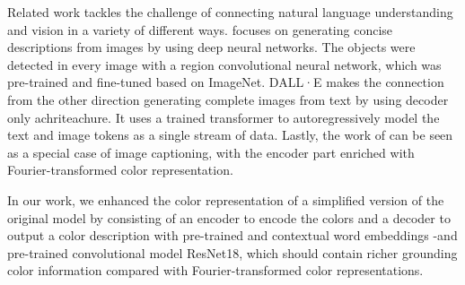 \par
Related work tackles the challenge of connecting natural language understanding and vision in a variety of different ways. \citep{karpathy-2014-image_descriptions} focuses on generating concise descriptions from images by using deep neural networks. The objects were detected in every image with a region convolutional neural network, which was  pre-trained and fine-tuned based on ImageNet. DALL·E makes the connection from the other direction generating complete images from text by using decoder only achriteachure. It uses a trained transformer to autoregressively model the text and image tokens as a single stream of data. Lastly, the work of \citep{monroe-2017-colors} can be seen as a special case of image captioning, with the encoder part enriched with Fourier-transformed color representation.

\par
In our work, we enhanced the color representation of a simplified version of the original model by \citep{monroe-2017-colors} consisting of an encoder to encode the colors and a decoder to output a color description with pre-trained and contextual word embeddings -and pre-trained convolutional model ResNet18, which should contain richer grounding color information compared with Fourier-transformed color representations.




